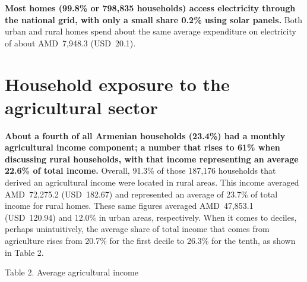 \documentclass[
  letterpaper,
  DIV=11,
  numbers=noendperiod]{scrartcl}
\begin{document}
\textbf{Most homes (99.8\% or 798,835 households) access electricity
through the national grid, with only a small share 0.2\% using solar
panels.} Both urban and rural homes spend about the same average
expenditure on electricity of about AMD~7,948.3 (USD~20.1).

\section{Household exposure to the agricultural
sector}\label{household-exposure-to-the-agricultural-sector}

\textbf{About a fourth of all Armenian households (23.4\%) had a monthly
agricultural income component; a number that rises to 61\% when
discussing rural households, with that income representing an average
22.6\% of total income.} Overall, 91.3\% of those 187,176 households
that derived an agricultural income were located in rural areas. This
income averaged AMD~72,275.2 (USD~182.67) and represented an average of
23.7\% of total income for rural homes. These same figures averaged
AMD~47,853.1 (USD~120.94) and 12.0\% in urban areas, respectively. When
it comes to deciles, perhaps unintuitively, the average share of total
income that comes from agriculture rises from 20.7\% for the first
decile to 26.3\% for the tenth, as shown in Table 2.

\label{_Ref154750198}{}Table 2. Average agricultural
income
\end{document}

